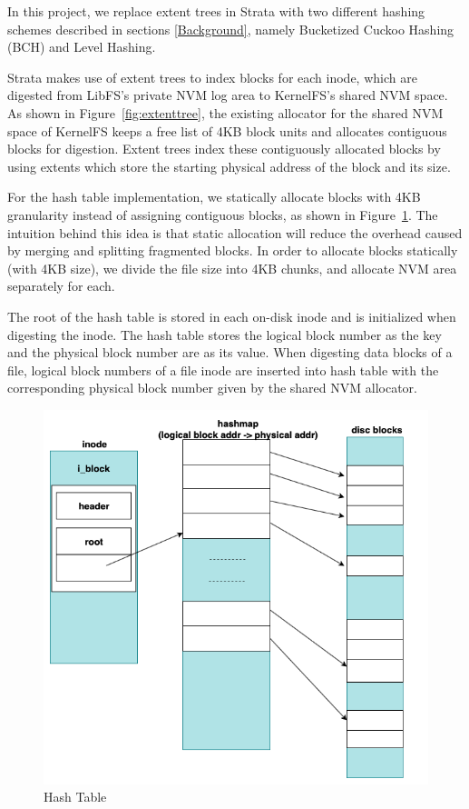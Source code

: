 \documentclass[letterpaper,twocolumn, 11pt]{article}
\begin{document}

In this project, we replace extent trees in Strata with two different hashing schemes described in sections \ref{Background}, namely Bucketized Cuckoo Hashing (BCH) and Level Hashing.

Strata makes use of extent trees to index blocks for each inode, which are digested from LibFS's private NVM log area to KernelFS's shared NVM space. As shown in Figure~\ref{fig:extenttree}, the existing allocator for the shared NVM space of KernelFS keeps a free list of 4KB block units and allocates contiguous blocks for digestion. Extent trees index these contiguously allocated blocks by using extents which store the starting physical address of the block and its size.

For the hash table implementation, we statically allocate blocks with 4KB granularity instead of assigning contiguous blocks, as shown in Figure~\ref{fig:hashtable}. The intuition behind this idea is that static allocation will reduce the overhead caused by merging and splitting fragmented blocks. In order to allocate blocks statically (with 4KB size), we divide the file size into 4KB chunks, and allocate NVM area separately for each.

The root of the hash table is stored in each on-disk inode and is initialized when digesting the inode. The hash table stores the logical block number as the key and the physical block number are as its value. When digesting data blocks of a file, logical block numbers of a file inode are inserted into hash table with the corresponding physical block number given by the shared NVM allocator.

\begin{figure}[t]
\centering
\includegraphics[width=.33\textwidth]{images/hash_table-2.png}
\caption{Hash Table}
\label{fig:hashtable}
\end{figure}
\end{document}
